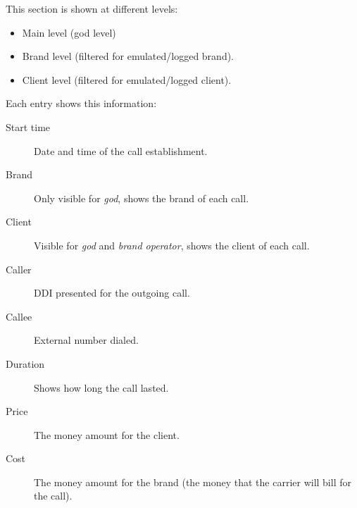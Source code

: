 \documentclass[letterpaper,10pt,english]{sphinxmanual}
\begin{document}
This section is shown at different levels:
\begin{itemize}
\item {} 
Main level (god level)

\item {} 
Brand level (filtered for emulated/logged brand).

\item {} 
Client level (filtered for emulated/logged client).

\end{itemize}

Each entry shows this information:
\begin{description}
\item[{Start time}] \leavevmode{}\label{administration_portal/client/vpbx/calls/external_calls:term-start-time}
Date and time of the call establishment.

\item[{Brand}] \leavevmode{}\label{administration_portal/client/vpbx/calls/external_calls:term-brand}
Only visible for \emph{god}, shows the brand of each call.

\item[{Client}] \leavevmode{}\label{administration_portal/client/vpbx/calls/external_calls:term-client}
Visible for \emph{god} and \emph{brand operator}, shows the client of each call.

\item[{Caller}] \leavevmode{}\label{administration_portal/client/vpbx/calls/external_calls:term-caller}
DDI presented for the outgoing call.

\item[{Callee}] \leavevmode{}\label{administration_portal/client/vpbx/calls/external_calls:term-callee}
External number dialed.

\item[{Duration}] \leavevmode{}\label{administration_portal/client/vpbx/calls/external_calls:term-duration}
Shows how long the call lasted.

\item[{Price}] \leavevmode{}\label{administration_portal/client/vpbx/calls/external_calls:term-price}
The money amount for the client.

\item[{Cost}] \leavevmode{}\label{administration_portal/client/vpbx/calls/external_calls:term-cost}
The money amount for the brand (the money that the carrier will bill for the call).


\end{description}
\end{document}
